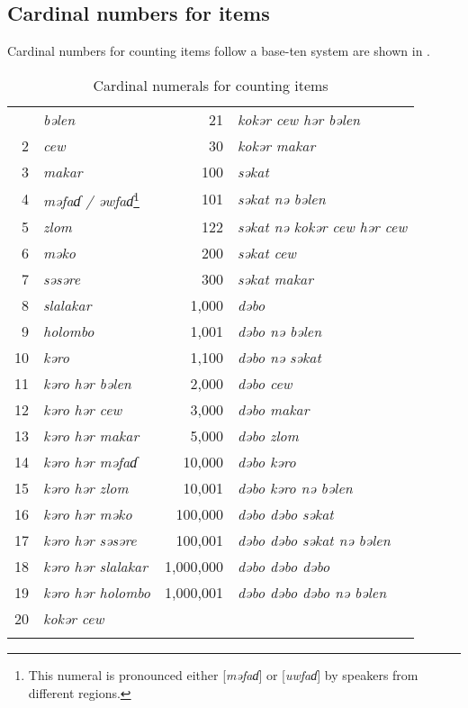 \subsection{Cardinal numbers for items}\label{sec:3.3.1}
\hypertarget{RefHeading1211041525720847}{}
Cardinal numbers for counting items follow a base-ten system are shown in .

\begin{table}
\begin{tabular}{rl@{\hspace{4em}}rl}
\lsptoprule
1 & \textit{bəlen} & 21 & \textit{kokər cew hər bəlen}\\
2 & \textit{cew} & 30 & \textit{kokər makar}\\
3 & \textit{makar} & 100 & \textit{səkat}\\
4 & \textit{məfaɗ / əwfaɗ}\footnote{This numeral is pronounced either [\textit{məfaɗ}] or [\textit{uwfaɗ}]  by speakers from different regions.} & 101 & \textit{səkat nə bəlen}\\
5 & \textit{zlom} & 122 & \textit{səkat nə kokər cew hər cew}\\
6 & \textit{məko} & 200 & \textit{səkat cew}\\
7 & \textit{səsəre} & 300 & \textit{səkat makar}\\
8 & \textit{slalakar} & 1,000 & \textit{dəbo}\\
9 & \textit{holombo} & 1,001 & \textit{dəbo nə bəlen}\\
10 & \textit{kəro} & 1,100 & \textit{dəbo  nə səkat}\\
11 & \textit{kəro hər bəlen} & 2,000 & \textit{dəbo cew}\\
12 & \textit{kəro hər cew} & 3,000 & \textit{dəbo makar}\\
13 & \textit{kəro hər makar} & 5,000 & \textit{dəbo zlom}\\
14 & \textit{kəro hər məfaɗ} & 10,000 & \textit{dəbo kəro}\\
15 & \textit{kəro hər zlom} & 10,001 & \textit{dəbo kəro nə bəlen}\\
16 & \textit{kəro hər məko} & 100,000 & \textit{dəbo dəbo səkat}\\
17 & \textit{kəro hər səsəre} & 100,001 & \textit{dəbo dəbo səkat nə bəlen}\\
18 & \textit{kəro hər slalakar} & 1,000,000 & \textit{dəbo dəbo dəbo}\\
19 & \textit{kəro hər holombo} & 1,000,001 & \textit{dəbo dəbo dəbo nə bəlen}\\
20 & \textit{kokər cew} &  & \\
\lspbottomrule
\end{tabular}

\caption{\label{tab:3.21}Cardinal numerals for counting items}
\end{table}

